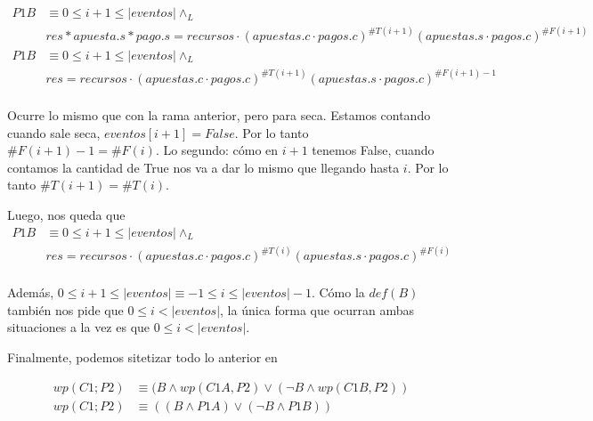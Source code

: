 \documentclass[../document.tex]{subfiles}
\begin{document}
\begin{equation} \label{eq2.b}
\begin{split}
P1B & \equiv 0\leq i+1 \leq |eventos| \land_L \\& res * apuesta.s * pago.s = recursos \cdot (apuestas.c\cdot pagos.c)^{\#T(i+1)}(apuestas.s\cdot pagos.c)^{\#F(i+1)}\\
P1B & \equiv 0\leq i+1 \leq |eventos| \land_L \\& res = recursos \cdot (apuestas.c\cdot pagos.c)^{\#T(i+1)}(apuestas.s\cdot pagos.c)^{\#F(i+1)-1}\\
\end{split}
\end{equation}

Ocurre lo mismo que con la rama anterior, pero para seca.
Estamos contando cuando sale seca, $eventos[i+1] = False$. Por lo tanto $\#F(i+1)-1=\#F(i)$. Lo segundo: cómo en $i+1$ tenemos False, cuando contamos la cantidad de True nos va a dar lo mismo que llegando hasta $i$. Por lo tanto $\#T(i+1)=\#T(i)$.

Luego, nos queda que
\begin{equation}
    \begin{split}
    P1B & \equiv 0\leq i+1 \leq |eventos| \land_L \\& res = recursos \cdot (apuestas.c\cdot pagos.c)^{\#T(i)}(apuestas.s\cdot pagos.c)^{\#F(i)}\\
    \end{split}
\end{equation}

Además, $0\leq i+1 \leq |eventos| \equiv -1\leq i \leq |eventos|-1$. Cómo la $def(B)$ también nos pide que $0 \leq i < |eventos|$, la única forma que ocurran ambas situaciones a la vez es que $0\leq i < |eventos|$.

Finalmente, podemos sitetizar todo lo anterior en

\begin{equation} \label{final}
\begin{split}
    wp(C1;P2) &\equiv (B \land wp(C1A, P2) \lor (\neg B \land wp(C1B, P2))\\
    wp(C1;P2) &\equiv ((B \land P1A) \lor (\neg B \land P1B))\\
\end{split}
\end{equation}
\end{document}
